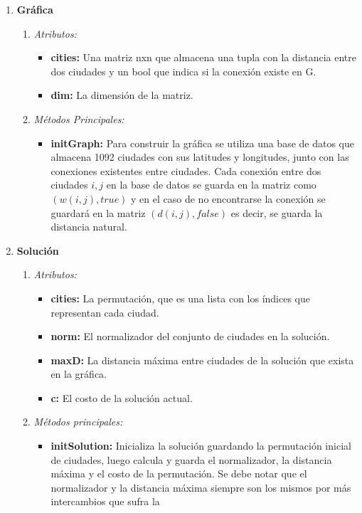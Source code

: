 \documentclass[12pt]{article}
\begin{document}
	\begin{enumerate}
		\item \textbf{Gráfica}
		\begin{enumerate}
			\item \textit{Atributos:}
		\begin{itemize}
			\item \textbf{cities:} Una matriz nxn que almacena una tupla con la 
			distancia entre dos ciudades y un bool que indica si la conexión existe en G.
			\item \textbf{dim: }La dimensión de la matriz.
		\end{itemize}
		\item\textit{Métodos Principales:}
		\begin{itemize}
			\item \textbf{initGraph: }
			Para construir la gráfica se utiliza una base de datos que almacena 1092 
			ciudades con sus latitudes y longitudes, junto con las conexiones existentes 
			entre ciudades.
		Cada conexión entre dos ciudades $i,j$ en la base de datos se guarda en la matriz como $(w(i,j),true)$ y en el caso de no encontrarse la conexión se guardará en la
		matriz $(d(i,j),false)$ es decir, se guarda la distancia natural. 
	\end{itemize} 
	\end{enumerate}
		\item \textbf{Solución}
		\begin{enumerate}
		\item \textit{Atributos:}
	\begin{itemize}
		\item\textbf{cities:} La permutación, que es una lista con los índices que 
		representan cada ciudad.
		\item \textbf{norm: }El normalizador del conjunto de ciudades en la solución.
		\item \textbf{maxD: } La distancia máxima entre ciudades de la solución que 
		exista en la gráfica.
		\item \textbf{c: } El costo de la solución actual.
	\end{itemize}
	\item \textit{Métodos principales:}
	\begin{itemize}
		\item \textbf{initSolution:} Inicializa la solución guardando la permutación 
		inicial de ciudades, luego calcula y guarda el normalizador, la distancia máxima
		y el costo de la permutación. Se debe notar que el normalizador y la
		distancia máxima siempre son los mismos por más intercambios que sufra la 

\end{itemize}
\end{enumerate}
\end{enumerate}
\end{document}
